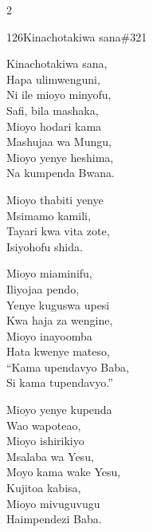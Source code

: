 \begin{multicols}{2}
\begin{hymn}{126}{Kinachotakiwa sana}{\#321}
\begin{stanza}
Kinachotakiwa sana,\\
Hapa ulimwenguni,\\
Ni ile mioyo minyofu,\\
Safi, bila mashaka,\\
Mioyo hodari kama\\
Mashujaa wa Mungu,\\
Mioyo yenye heshima,\\
Na kumpenda Bwana.
\end{stanza}
\begin{chorus}
Mioyo thabiti yenye\\
Msimamo kamili,\\
Tayari kwa vita zote,\\
Isiyohofu shida.
\end{chorus}
\begin{stanza}
Mioyo miaminifu,\\
Iliyojaa pendo,\\
Yenye kuguswa upesi\\
Kwa haja za wengine,\\
Mioyo inayoomba\\
Hata kwenye mateso,\\
``Kama upendavyo Baba,\\
Si kama tupendavyo.''
\end{stanza}
\begin{stanza}
Mioyo yenye kupenda\\
Wao wapoteao,\\
Mioyo ishirikiyo\\
Msalaba wa Yesu,\\
Moyo kama wake Yesu,\\
Kujitoa kabisa,\\
Mioyo mivuguvugu\\
Haimpendezi Baba.
\end{stanza}
\end{hymn}


\end{multicols}
